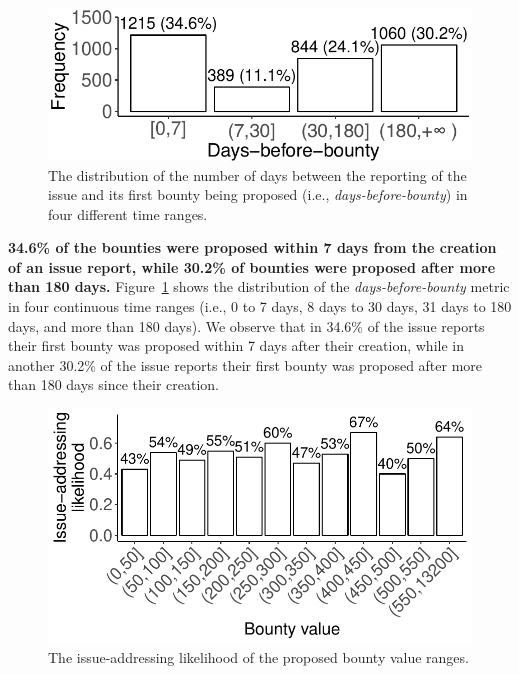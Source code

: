 \begin{figure}[t]
\centering\includegraphics[width=0.8\columnwidth]{pics/pre/pre_delta_distribution_bounty}
\vspace{-0.1in}
\caption{The distribution of the number of days between the reporting of the issue and its first bounty being proposed (i.e., \textit{days-before-bounty}) in four different time ranges.}
\label{fig:pre_delta_distribution_bounty}
\vspace{-0.25in}

\end{figure}

\textbf{ 34.6\% of the bounties were proposed within 7 days from the creation of an issue report, while 30.2\% of bounties were proposed after more than 180 days.}
Figure~\ref{fig:pre_delta_distribution_bounty} shows the distribution of the \textit{days-before-bounty} metric in four continuous time ranges (i.e., 0 to 7 days, 8 days to 30 days, 31 days to 180 days, and more than 180 days). We observe that in 34.6\% of the issue reports their first bounty was proposed within 7 days after their creation, while in another 30.2\% of the issue reports their first bounty was proposed after more than 180 days since their creation.



 \begin{figure}[t]
   \centering
  \includegraphics[width=0.8\columnwidth]{pics/pre/pre_i_value.pdf}
  \caption{The issue-addressing likelihood of the proposed bounty value ranges.}
  \label{fig:pre_v_value}
  \vspace{-0.1in}

\end{figure}


